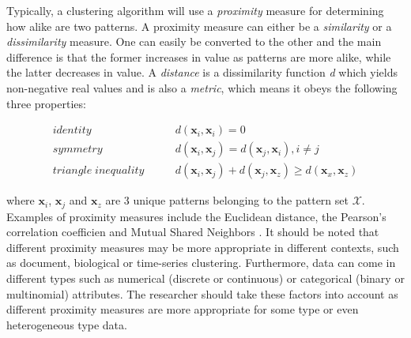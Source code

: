 Typically, a clustering algorithm will use a \emph{proximity} measure for determining how alike are two patterns.
A proximity measure can either be a \emph{similarity} or a \emph{dissimilarity} measure.
One can easily be converted to the other and the main difference is that the former increases in value as patterns are more alike, while the latter decreases in value.
A \emph{distance} is a dissimilarity function \emph{d} which yields non-negative real values and is also a \emph{metric}, which means it obeys the following three properties:



\begin{align*} 
    identity \qquad & d(\mathbf{x}_i, \mathbf{x}_i) = 0  \\
    symmetry \qquad & d(\mathbf{x}_i, \mathbf{x}_j) = d(\mathbf{x}_j, \mathbf{x}_i), i \neq j \\ 
    triangle \; inequality \qquad & d(\mathbf{x}_i, \mathbf{x}_j) + d(\mathbf{x}_j, \mathbf{x}_z)  \ge d(\mathbf{x}_x, \mathbf{x}_z)
\end{align*}




where $\mathbf{x}_i$, $\mathbf{x}_j$ and $\mathbf{x}_z$ are 3 unique patterns belonging to the pattern set $\mathcal{X}$.
Examples of proximity measures include the Euclidean distance, the Pearson’s correlation coefficien and Mutual Shared Neighbors \cite{jarvis1973clustering}.
It should be noted that different proximity measures may be more appropriate in different contexts, such as document, biological or time-series clustering.
Furthermore, data can come in different types such as numerical (discrete or continuous) or categorical (binary or multinomial) attributes.
The researcher should take these factors into account as different proximity measures are more appropriate for some type or even heterogeneous type data. 

